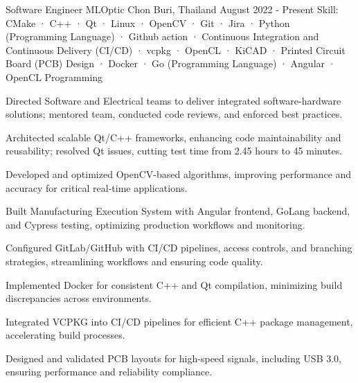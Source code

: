 
\begin{cventries}

  \cventry
    {Software Engineer} %
    {MLOptic} %
    {Chon Buri, Thailand} %
    {August 2022 - Present} %
    {Skill: CMake · C++ · Qt · Linux · OpenCV · Git · Jira · Python (Programming Language) · Github action · Continuous Integration and Continuous Delivery (CI/CD) · vcpkg · OpenCL · KiCAD · Printed Circuit Board (PCB) Design · Docker · Go (Programming Language) · Angular · OpenCL Programming} %
    {
      \begin{cvitems} %
      \item {Directed Software and Electrical teams to deliver integrated software-hardware solutions; mentored team, conducted code reviews, and enforced best practices.}
      \item {Architected scalable Qt/C++ frameworks, enhancing code maintainability and reusability; resolved Qt issues, cutting test time from 2.45 hours to 45 minutes.}
      \item {Developed and optimized OpenCV-based algorithms, improving performance and accuracy for critical real-time applications.}
      \item {Built Manufacturing Execution System with Angular frontend, GoLang backend, and Cypress testing, optimizing production workflows and monitoring.}
      \item {Configured GitLab/GitHub with CI/CD pipelines, access controls, and branching strategies, streamlining workflows and ensuring code quality.}
      \item {Implemented Docker for consistent C++ and Qt compilation, minimizing build discrepancies across environments.}
      \item {Integrated VCPKG into CI/CD pipelines for efficient C++ package management, accelerating build processes.}
      \item {Designed and validated PCB layouts for high-speed signals, including USB 3.0, ensuring performance and reliability compliance.}

\end{cvitems}}
\end{cventries}
